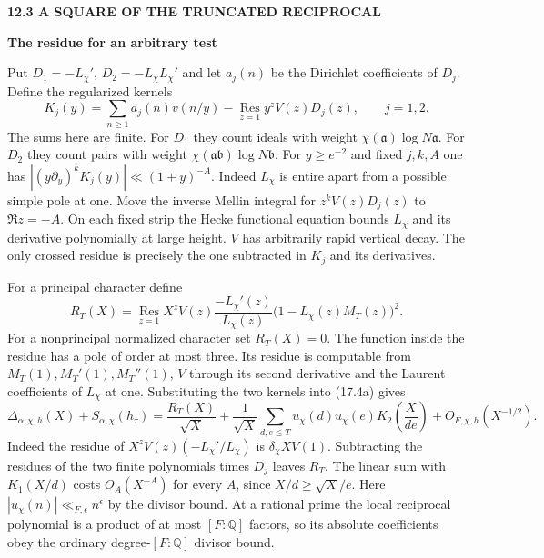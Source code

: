 \documentclass[11pt,letterpaper]{article}
\newcommand{\rightmarktext}{}
\newcommand{\printfolio}{}
\newcommand{\leaf}[4]{\clearpage\gdef\printfolio{#1}\gdef\rightmarktext{#2}%
  {\small\sffamily\bfseries\color{ink}#3\par}\vspace{3pt}%
  {\LARGE\bfseries #4\par}\vspace{5pt}}
\newcommand{\Q}{\mathbb Q}
\begin{document}
\leaf{514g}{The polar contribution}{12.3 \quad A SQUARE OF THE TRUNCATED RECIPROCAL}{The residue for an arbitrary test}
Put $D_1=-L_\chi'$, $D_2=-L_\chi L_\chi'$ and let $a_j(n)$ be the
Dirichlet coefficients of $D_j$. Define the regularized kernels
\[
 K_j(y)=\sum_{n\ge1}a_j(n)v(n/y)
            -\operatorname*{Res}_{z=1} y^z V(z)D_j(z),\qquad j=1,2.
\]
The sums here are finite. For $D_1$ they count ideals with weight
$\chi(\mathfrak a)\log N\mathfrak a$. For $D_2$ they count pairs with
weight $\chi(\mathfrak a\mathfrak b)\log N\mathfrak b$. For $y\ge e^{-2}$
and fixed $j,k,A$ one has $|(y\partial_y)^kK_j(y)|\ll(1+y)^{-A}$.
Indeed $L_\chi$ is entire apart from a possible simple pole at one.
Move the inverse Mellin integral for $z^kV(z)D_j(z)$ to $\Re z=-A$.
On each fixed strip the Hecke functional equation bounds $L_\chi$
and its derivative polynomially at large height. $V$ has arbitrarily
rapid vertical decay. The only crossed residue is precisely the one
subtracted in $K_j$ and its derivatives.

For a principal character define
\[
 R_T(X)=\operatorname*{Res}_{z=1}
       X^z V(z)\frac{-L_\chi'(z)}{L_\chi(z)}
                     \big(1-L_\chi(z)M_T(z)\big)^2 .
\]
For a nonprincipal normalized character set $R_T(X)=0$.
The function inside the residue has a pole of order at most three.
Its residue is computable
from $M_T(1),M_T'(1),M_T''(1)$, $V$ through its second derivative
and the Laurent coefficients of $L_\chi$ at one. Substituting the
two kernels into (17.4a) gives
\[
 \Delta_{\alpha,\chi,h}(X)+S_{\alpha,\chi}(h_\tau)=
 \frac{R_T(X)}{\sqrt X}
 +\frac1{\sqrt X}\sum_{d,e\le T}u_\chi(d)u_\chi(e)
                           K_2\!\left(\frac{X}{de}\right)
 +O_{F,\chi,h}(X^{-1/2}).
 \tag{17.4b}
\]
Indeed the residue of $X^zV(z)(-L_\chi'/L_\chi)$ is $\delta_\chi XV(1)$.
Subtracting the residues of the two finite polynomials times $D_j$
leaves $R_T$. The linear sum with $K_1(X/d)$ costs $O_A(X^{-A})$
for every $A$, since $X/d\ge\sqrt X/e$.
Here $|u_\chi(n)|\ll_{F,\epsilon}n^\epsilon$ by the divisor bound.
At a rational prime the local reciprocal polynomial is a product of
at most $[F:\Q]$ factors, so its absolute coefficients obey the
ordinary degree-$[F:\Q]$ divisor bound.
\end{document}
